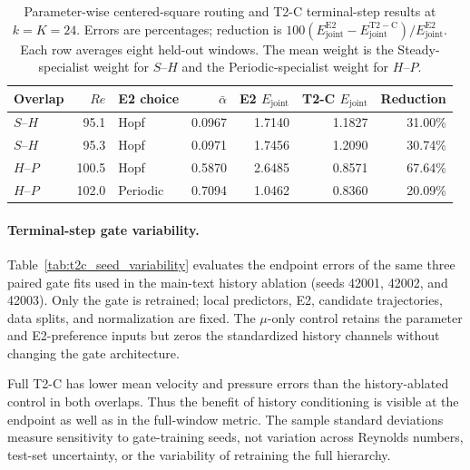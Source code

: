 \begin{table}[H]
\centering
\caption{
Parameter-wise centered-square routing and T2-C terminal-step results at $k=K=24$.
Errors are percentages; reduction is
$100(E_{\mathrm{joint}}^{\mathrm{E2}}-
E_{\mathrm{joint}}^{\mathrm{T2-C}})/E_{\mathrm{joint}}^{\mathrm{E2}}$.
Each row averages eight held-out windows.
The mean weight is the Steady-specialist weight for $S$--$H$
and the Periodic-specialist weight for $H$--$P$.
}
\label{tab:square_parameter}
\small
\setlength{\tabcolsep}{3.5pt}
\begin{tabular}{lrlrrrr}
\toprule
Overlap & $Re$ & E2 choice & $\bar\alpha$ & E2 $E_{\mathrm{joint}}$ & T2-C $E_{\mathrm{joint}}$ & Reduction \\
\midrule
$S$--$H$ & 95.1 & Hopf & 0.0967 & 1.7140 & 1.1827 & 31.00\% \\
$S$--$H$ & 95.3 & Hopf & 0.0971 & 1.7456 & 1.2090 & 30.74\% \\
$H$--$P$ & 100.5 & Hopf & 0.5870 & 2.6485 & 0.8571 & 67.64\% \\
$H$--$P$ & 102.0 & Periodic & 0.7094 & 1.0462 & 0.8360 & 20.09\% \\
\bottomrule
\end{tabular}
\end{table}

\paragraph{Terminal-step gate variability.}
Table~\ref{tab:t2c_seed_variability} evaluates the endpoint errors
of the same three paired gate fits used in the main-text history
ablation (seeds 42001, 42002, and 42003).
Only the gate is retrained; local predictors, E2, candidate trajectories,
data splits, and normalization are fixed.
The $\mu$-only control retains the parameter and E2-preference inputs
but zeros the standardized history channels without changing the
gate architecture.

Full T2-C has lower mean velocity and pressure errors than the
history-ablated control in both overlaps. Thus the benefit of history
conditioning is visible at the endpoint as well as in the full-window
metric. The sample standard deviations measure sensitivity to
gate-training seeds, not variation across Reynolds numbers, test-set
uncertainty, or the variability of retraining the full hierarchy.

